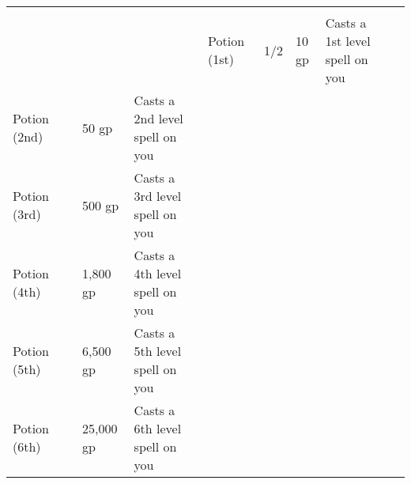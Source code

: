 
\begin{longtabuwrapper}
\begin{longtabu}{l l l X l}
 \\
 &  &  &  &  \tableheaderrule
Potion (1st) & 1/2 & 10 gp & Casts a 1st level spell on you & \pageref{item:Potion (1st)} \\
Potion (2nd) &  & 50 gp & Casts a 2nd level spell on you & \pageref{item:Potion (2nd)} \\
Potion (3rd) &  & 500 gp & Casts a 3rd level spell on you & \pageref{item:Potion (3rd)} \\
Potion (4th) &  & 1,800 gp & Casts a 4th level spell on you & \pageref{item:Potion (4th)} \\
Potion (5th) &  & 6,500 gp & Casts a 5th level spell on you & \pageref{item:Potion (5th)} \\
Potion (6th) &  & 25,000 gp & Casts a 6th level spell on you & \pageref{item:Potion (6th)} \\
\end{longtabu}
\end{longtabuwrapper}
